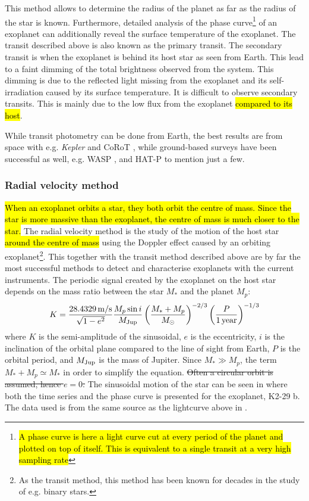 This method allows to determine the radius of the planet as far as the radius of the star is known.
Furthermore, detailed analysis of the phase curve\footnote{\hl{A phase curve is here a light curve
cut at every period of the planet and plotted on top of itself. This is equivalent to a single
transit at a very high sampling rate}} of an exoplanet can additionally reveal the surface
temperature of the exoplanet. The transit described above is also known as the primary transit. The
secondary transit is when the exoplanet is behind its host star as seen from Earth. This lead to a
faint dimming of the total brightness observed from the system. This dimming is due to the reflected
light missing from the exoplanet and its self-irradiation caused by its surface temperature. It is
difficult to observe secondary transits. This is mainly due to the low flux from the exoplanet
\hl{compared to its host}.

While transit photometry can be done from Earth, the best results are from space with e.g.
\emph{Kepler} \citep{Borucki2010} and CoRoT \citep{Baglin2006}, while ground-based surveys have been
successful as well, e.g. WASP \citep{Pollacco2006}, and HAT-P \citep{Bakos2004} to mention just a
few.



\subsubsection{Radial velocity method}
\label{sec:rvmethod}

\hl{When an exoplanet orbits a star, they both orbit the centre of mass. Since the star is more
massive than the exoplanet, the centre of mass is much closer to the star.} The radial velocity
method is the study of the motion of the host star \hl{around the centre of mass} using the Doppler
effect caused by an orbiting exoplanet\footnote{As the transit method, this method has been known
for decades in the study of e.g. binary stars.}. This together with the transit method described
above are by far the most successful methods to detect and characterise exoplanets  with the current
instruments. The periodic signal created by the exoplanet on the host star depends on the mass ratio
between the star $M_\ast$ and the planet $M_p$:
\begin{align}
  K = \frac{\SI{28.4329}{m/s}}{\sqrt{1-e^2}} \frac{M_p\sin i}{M_\mathrm{Jup}} \left( \frac{M_\ast+M_p}{M_\odot} \right)^{-2/3} \left(\frac{P}{\SI{1}{year}}\right)^{-1/3}  \label{eq:rv}
\end{align}
where $K$ is the semi-amplitude of the sinusoidal, $e$ is the eccentricity, $i$ is the inclination
of the orbital plane compared to the line of sight from Earth, $P$ is the orbital period, and
$M_\mathrm{Jup}$ is the mass of Jupiter. Since $M_\ast \gg M_p$, the term $M_\ast+M_p\simeq M_\ast$ in order
to simplify the equation. \st{Often a circular orbit is assumed, hence $e=0$.} The sinusoidal motion
of the star can be seen in  where both the time series and the phase curve is
presented for the exoplanet, K2-29 b. The data used is from the same source as the lightcurve above
in .

